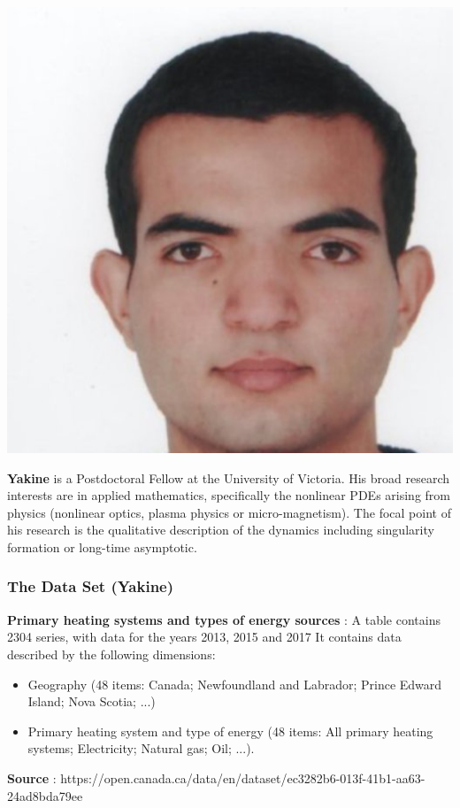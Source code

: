 \documentclass{beamer}
\begin{document}
\begin{frame}
\vspace{10pt}
\begin{minipage}[c]{0.15\textwidth}
\includegraphics[width=\textwidth, trim={60pt 0pt 0pt 0pt}, clip]{TeamPics/yakine.jpg}
\end{minipage}\hspace{0.05\textwidth}%
\begin{minipage}[c]{0.8\textwidth}
{\small \textbf{Yakine} is a Postdoctoral Fellow at the University of Victoria. His broad research interests are in applied mathematics,
specifically the nonlinear PDEs arising from physics (nonlinear optics, plasma physics or micro-magnetism). The focal point of his research is the qualitative description of the dynamics including singularity formation or long-time asymptotic. 
}
\end{minipage}


\end{frame}





\begin{frame}
\frametitle{The Data Set (Yakine)}
\textbf{Primary heating systems and types of energy sources} : A table contains 2304 series, with data for the years 2013, 2015 and 2017
It contains data described by the following dimensions:
\begin{itemize}
\item Geography (48 items: Canada; Newfoundland and Labrador; Prince Edward Island; Nova Scotia; ...)
\item Primary heating system and type of energy (48 items: All primary heating systems; Electricity; Natural gas; Oil; ...).
\end{itemize}
\textbf{Source} : https://open.canada.ca/data/en/dataset/ec3282b6-013f-41b1-aa63-24ad8bda79ee
\end{frame}
\end{document}

